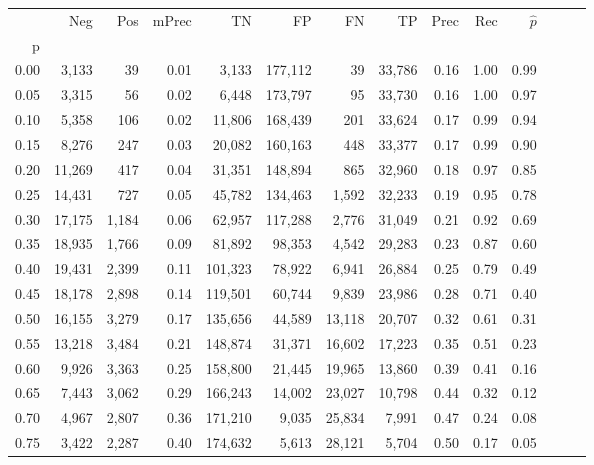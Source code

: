 \begin{tabular}{rrrrrrrrrrrrrr}
\toprule
{} &     Neg &    Pos & mPrec &       TN &       FP &      FN &      TP &  Prec &   Rec & $\hat{p}$ \\
p    &         &        &       &          &          &         &         &       &       &           \\
\midrule
0.00 &   3,133 &     39 &  0.01 &    3,133 &  177,112 &      39 &  33,786 &  0.16 &  1.00 &      0.99 \\
0.05 &   3,315 &     56 &  0.02 &    6,448 &  173,797 &      95 &  33,730 &  0.16 &  1.00 &      0.97 \\
0.10 &   5,358 &    106 &  0.02 &   11,806 &  168,439 &     201 &  33,624 &  0.17 &  0.99 &      0.94 \\
0.15 &   8,276 &    247 &  0.03 &   20,082 &  160,163 &     448 &  33,377 &  0.17 &  0.99 &      0.90 \\
0.20 &  11,269 &    417 &  0.04 &   31,351 &  148,894 &     865 &  32,960 &  0.18 &  0.97 &      0.85 \\
0.25 &  14,431 &    727 &  0.05 &   45,782 &  134,463 &   1,592 &  32,233 &  0.19 &  0.95 &      0.78 \\
0.30 &  17,175 &  1,184 &  0.06 &   62,957 &  117,288 &   2,776 &  31,049 &  0.21 &  0.92 &      0.69 \\
0.35 &  18,935 &  1,766 &  0.09 &   81,892 &   98,353 &   4,542 &  29,283 &  0.23 &  0.87 &      0.60 \\
0.40 &  19,431 &  2,399 &  0.11 &  101,323 &   78,922 &   6,941 &  26,884 &  0.25 &  0.79 &      0.49 \\
0.45 &  18,178 &  2,898 &  0.14 &  119,501 &   60,744 &   9,839 &  23,986 &  0.28 &  0.71 &      0.40 \\
0.50 &  16,155 &  3,279 &  0.17 &  135,656 &   44,589 &  13,118 &  20,707 &  0.32 &  0.61 &      0.31 \\
0.55 &  13,218 &  3,484 &  0.21 &  148,874 &   31,371 &  16,602 &  17,223 &  0.35 &  0.51 &      0.23 \\
0.60 &   9,926 &  3,363 &  0.25 &  158,800 &   21,445 &  19,965 &  13,860 &  0.39 &  0.41 &      0.16 \\
0.65 &   7,443 &  3,062 &  0.29 &  166,243 &   14,002 &  23,027 &  10,798 &  0.44 &  0.32 &      0.12 \\
0.70 &   4,967 &  2,807 &  0.36 &  171,210 &    9,035 &  25,834 &   7,991 &  0.47 &  0.24 &      0.08 \\
0.75 &   3,422 &  2,287 &  0.40 &  174,632 &    5,613 &  28,121 &   5,704 &  0.50 &  0.17 &      0.05 \\

\end{tabular}
